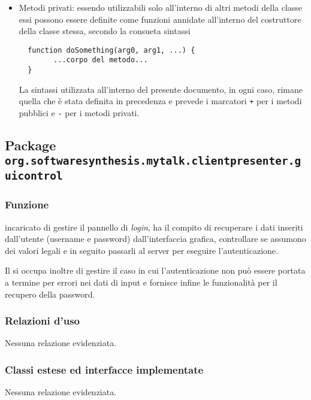 \begin{description}
\begin{itemize}
\item Metodi privati: essendo utilizzabili solo all'interno di altri metodi della classe essi possono essere definite come funzioni annidate all'interno del costruttore della classe stessa, secondo la consueta sintassi
\begin{verbatim}
  function doSomething(arg0, arg1, ...) {
        ...corpo del metodo...
  }
\end{verbatim}

La sintassi utilizzata all'interno del presente documento, in ogni caso, rimane quella che è stata definita in precedenza e prevede i marcatori \verb|+| per i metodi pubblici e \verb|-| per i metodi privati.
	\end{itemize}
\end{description}

\subsection{Package \texttt{org.softwaresynthesis.mytalk.clientpresenter.guicontrol}}\label{sec:guicontrol}


\subsubsection*{Funzione}
 incaricato di gestire il pannello di \textit{login}, ha il compito di recuperare i dati inseriti dall'utente (username e password) dall'interfaccia grafica, controllare se assumono dei valori legali e in seguito passarli al server per eseguire l'autenticazione.

Il  si occupa inoltre di gestire il caso in cui l'autenticazione non può essere portata a termine per errori nei dati di input e fornisce infine le funzionalità per il recupero della password.

\subsubsection*{Relazioni d'uso}

Nessuna relazione evidenziata.

\subsubsection*{Classi estese ed interfacce implementate}

Nessuna relazione evidenziata.

